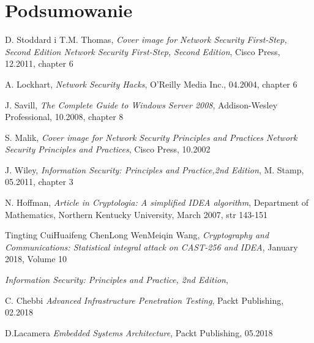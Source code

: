 \documentclass[12p]{article}
\begin{document}
\section{Podsumowanie}
\newpage
\begin{thebibliography}{99}

 D. Stoddard i T.M. Thomas,
\emph{
Cover image for Network Security First-Step, Second Edition
Network Security First-Step, Second Edition},
Cisco Press, 12.2011, chapter 6

 A. Lockhart,
\emph{Network Security Hacks},
O'Reilly Media Inc., 04.2004, chapter 6

 J. Savill,
\emph{The Complete Guide to Windows Server 2008},
Addison-Wesley Professional, 10.2008, chapter 8

 S. Malik,
\emph{Cover image for Network Security Principles and Practices
Network Security Principles and Practices},
Cisco Press, 10.2002

 J. Wiley,
\emph{Information Security: Principles and Practice,2nd Edition},
M. Stamp, 05.2011, chapter 3

 N. Hoffman,
\emph{Article in Cryptologia: A simplified IDEA algorithm},
Department of Mathematics, Northern Kentucky University, March 2007, str 143-151

 Tingting CuiHuaifeng ChenLong WenMeiqin Wang,
\emph{Cryptography and Communications: Statistical integral attack on CAST-256 and IDEA}, January 2018, Volume 10

\emph{Information Security: Principles and Practice, 2nd Edition},

 C. Chebbi
\emph{Advanced Infrastructure Penetration Testing},
Packt Publishing, 02.2018

D.Lacamera
\emph{Embedded Systems Architecture},
Packt Publishing, 05.2018


\end{thebibliography}
\newpage
\listoffigures
{}
\end{document}
